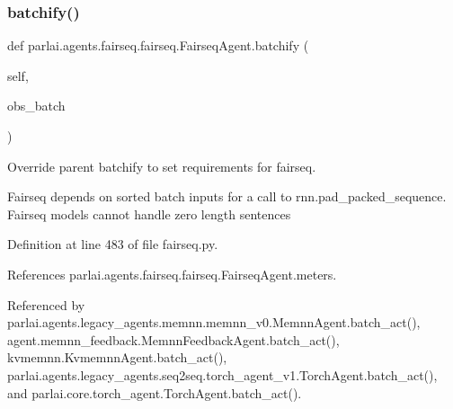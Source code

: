 \subsubsection{\texorpdfstring{batchify()}{batchify()}}
{\footnotesize\ttfamily def parlai.\+agents.\+fairseq.\+fairseq.\+Fairseq\+Agent.\+batchify (\begin{DoxyParamCaption}\item[{}]{self,  }\item[{}]{obs\+\_\+batch }\end{DoxyParamCaption})}

\begin{DoxyVerb}Override parent batchify to set requirements for fairseq.

Fairseq depends on sorted batch inputs for a call to rnn.pad_packed_sequence.
Fairseq models cannot handle zero length sentences
\end{DoxyVerb}
 

Definition at line 483 of file fairseq.\+py.



References parlai.\+agents.\+fairseq.\+fairseq.\+Fairseq\+Agent.\+meters.



Referenced by parlai.\+agents.\+legacy\+\_\+agents.\+memnn.\+memnn\+\_\+v0.\+Memnn\+Agent.\+batch\+\_\+act(), agent.\+memnn\+\_\+feedback.\+Memnn\+Feedback\+Agent.\+batch\+\_\+act(), kvmemnn.\+Kvmemnn\+Agent.\+batch\+\_\+act(), parlai.\+agents.\+legacy\+\_\+agents.\+seq2seq.\+torch\+\_\+agent\+\_\+v1.\+Torch\+Agent.\+batch\+\_\+act(), and parlai.\+core.\+torch\+\_\+agent.\+Torch\+Agent.\+batch\+\_\+act().

